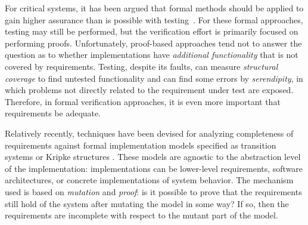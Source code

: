 

For critical systems, it has been argued that formal methods
should be applied to gain higher assurance than is possible with testing~\cite{Miller10:CACM,Rushby09:SEFM,Hardin09:Security}.  For these formal approaches, testing may still be performed, but the verification effort is primarily focused on performing proofs.  Unfortunately, proof-based approaches tend not to answer the question as to whether implementations have {\em additional functionality} that is not covered by requirements.  Testing, despite its faults, can measure {\em structural coverage} to find untested functionality and can find some errors by {\em serendipity}, in which problems not directly related to the requirement under test are exposed.  Therefore, in formal verification approaches, it is even more important that requirements be adequate.

Relatively recently, techniques have been devised for analyzing completeness of requirements against formal implementation models specified as transition systems or Kripke structures \cite{chockler2001practical,das2005formal, claessen2007coverage, grosse2007estimating}.  These models are agnostic to the abstraction level of the implementation: implementations can be lower-level requirements, software architectures, or concrete implementations of system behavior.  The mechanism used is based on {\em mutation} and {\em proof}: is it possible to prove that the requirements still hold of the system after mutating the model in some way?  If so, then the requirements are incomplete with respect to the mutant part of the model.

